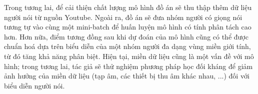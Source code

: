 \documentclass[a4paper, 13pt, oneside]{report}
\begin{document}
Trong tương lai, để cải thiện chất lượng mô hình đồ án sẽ thu thập thêm dữ liệu người nói từ nguồn Youtube. Ngoài ra, đồ án sẽ đưa nhóm người có giọng nói tương tự vào cùng một mini-batch để huấn luyện mô hình có tính phân tách cao hơn. Hơn nữa, điểm tương đồng sau khi dự đoán của mô hình cũng có thể được chuẩn hoá dựa trên biểu diễn của một nhóm người đa dạng vùng miền giới tính, từ đó tăng khả năng phân biệt. Hiện tại, miền dữ liệu cũng là một vấn đề với mô hình; trong tương lai, tác giả sẽ thử nghiệm phương pháp học đối kháng để giảm ảnh hưởng của miền dữ liệu (tạp âm, các thiết bị thu âm khác nhau, ...) đối với biểu diễn người nói.

\pagebreak
% 



\end{document}

